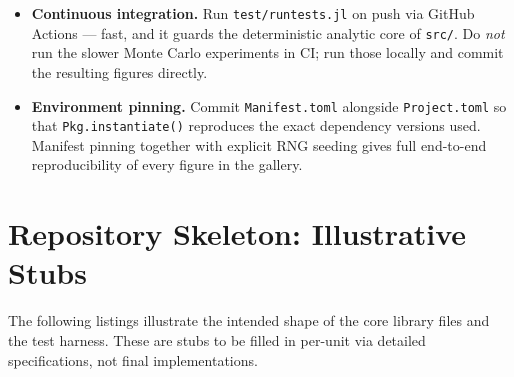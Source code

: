 \documentclass[11pt]{article}
\begin{document}
\begin{itemize}[leftmargin=1.4cm]
\begin{itemize}[leftmargin=1.0cm]
  \end{itemize}
  \item \textbf{Continuous integration.} Run \texttt{test/runtests.jl} on push via GitHub Actions --- fast, and it guards the deterministic analytic core of \texttt{src/}. Do \emph{not} run the slower Monte Carlo experiments in CI; run those locally and commit the resulting figures directly.
  \item \textbf{Environment pinning.} Commit \texttt{Manifest.toml} alongside \texttt{Project.toml} so that \texttt{Pkg.instantiate()} reproduces the exact dependency versions used. Manifest pinning together with explicit RNG seeding gives full end-to-end reproducibility of every figure in the gallery.
\end{itemize}

\appendix
\section{Repository Skeleton: Illustrative Stubs}

The following listings illustrate the intended shape of the core library files and the test harness. These are stubs to be filled in per-unit via detailed specifications, not final implementations.
\end{document}
